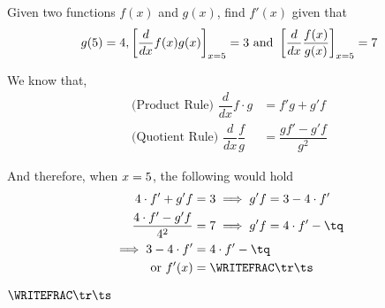 



\SQUARE\vb\tp
\gcalcexpr[0]\tq{\vd * \tp}
\ADD\tq\vc\tr
\MULTIPLY{}\ts

\question[3] Given two functions $f(x)$ and $g(x)$, find $f'(x)$ given that 
\[ g(5) = 4, \left[\dfrac{d}{dx} f(x)g(x)\right]_{x=5} = 3\text{ and } 
\left[\dfrac{d}{dx}\dfrac{f(x)}{g(x)}\right]_{x=5} = 7 \]

\watchout

\begin{solution}[\halfpage]
	We know that, 
	\begin{align}
		\text{(Product Rule) }\dfrac{d}{dx} f\cdot g &= f'g + g'f \\
		\text{(Quotient Rule) }\dfrac{d}{dx}\dfrac{f}{g} &= \dfrac{gf' - g'f}{g^2}
	\end{align}
	
	And therefore, when $x=5$, the following would hold 
	\begin{align}
		\vb\cdot f' + g'f &= \vc \implies g'f = \vc - \vb\cdot f' \\
		\dfrac{\vb\cdot f' - g'f }{\vb^2} &= \vd \implies g'f = \vb\cdot f' - \tq \\
		\implies \vc - \vb\cdot f' &= \vb\cdot f' - \tq \\
		\text{ or } f'(x) &= \WRITEFRAC\tr\ts
	\end{align}
\end{solution}

\ifprintanswers\begin{codex}$\WRITEFRAC\tr\ts$\end{codex}\fi
